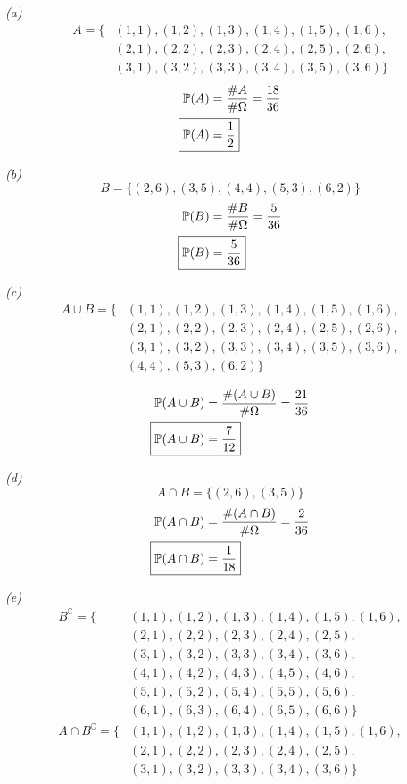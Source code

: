 \documentclass[titlepage, 12pt, leqno]{article}
\begin{document}
\textit{(a)} 
\setlength{\jot}{5pt}
\begin{align*}
    A = \{&(1,1), (1,2), (1,3), (1,4), (1,5), (1,6), \\
          &(2,1), (2,2), (2,3), (2,4), (2,5), (2,6), \\
          &(3,1), (3,2), (3,3), (3,4), (3,5), (3,6)\}
\end{align*}
\begin{align*}
    \mathbb{P}(A) &= \frac{\#A}{\#\Omega} = \frac{18}{36} \\
    \Aboxed{\mathbb{P}(A) &= \frac{1}{2}}
\end{align*}

\textit{(b)} 
\[
    B = \{(2,6), (3,5), (4,4), (5,3), (6,2)\}
\]
\begin{align*}
    \mathbb{P}(B) &= \frac{\#B}{\#\Omega} = \frac{5}{36} \\
    \Aboxed{\mathbb{P}(B) &= \frac{5}{36}}
\end{align*}

\textit{(c)} 
\begin{align*}
     A \cup B = \{&(1,1), (1,2), (1,3), (1,4), (1,5), (1,6), \\
             &(2,1), (2,2), (2,3), (2,4), (2,5), (2,6), \\
             &(3,1), (3,2), (3,3), (3,4), (3,5), (3,6), \\
             &(4,4), (5,3), (6,2)\}
\end{align*}

\begin{align*}
    \mathbb{P}(A \cup B) &= \frac{\#(A \cup B)}{\#\Omega} = \frac{21}{36} \\
    \Aboxed{\mathbb{P}(A \cup B) &= \frac{7}{12}}
\end{align*}

\textit{(d)} 
\[
    A \cap B = \{(2,6), (3,5)\}
\]
\begin{align*}
    \mathbb{P}(A \cap B) &= \frac{\#(A \cap B)}{\#\Omega} = \frac{2}{36} \\
    \Aboxed{\mathbb{P}(A \cap B) &= \frac{1}{18}}
\end{align*}


\textit{(e)} 
\begin{align*}
    B^\complement = \{&(1,1), (1,2), (1,3), (1,4), (1,5), (1,6), \\
          &(2,1), (2,2), (2,3), (2,4), (2,5), \\
          &(3,1), (3,2), (3,3), (3,4), (3,6), \\
          &(4,1), (4,2), (4,3), (4,5), (4,6), \\
          &(5,1), (5,2), (5,4), (5,5), (5,6), \\
          &(6,1), (6,3), (6,4), (6,5), (6,6) \} \\[.1in]
    A \cap B^\complement = \{&(1,1), (1,2), (1,3), (1,4), (1,5), (1,6), \\
             &(2,1), (2,2), (2,3), (2,4), (2,5), \\
             &(3,1), (3,2), (3,3), (3,4), (3,6)\}
\end{align*}
\end{document}
